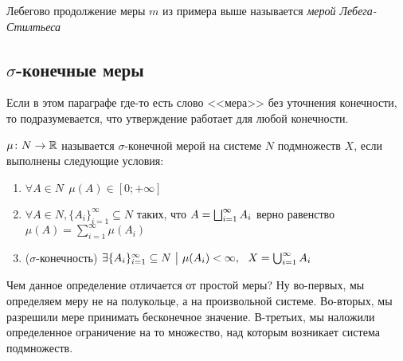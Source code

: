 \begin{definition}
	Лебегово продолжение меры $m$ из примера выше называется \textit{мерой Лебега-Стилтьеса}
\end{definition}

\subsection{$\sigma$-конечные меры}

\begin{note}
	Если в этом параграфе где-то есть слово <<мера>> без уточнения конечности, то подразумевается, что утверждение работает для любой конечности.
\end{note}

\begin{definition}
	$\mu \colon N \to \mathbb{R}$ называется $\sigma$-конечной мерой на системе $N$ подмножеств $X$, если выполнены следующие условия:
	\begin{enumerate}
		\item $\forall A \in N\ \ \mu(A) \in [0; +\infty]$
		
		\item $\forall A \in N, \{A_i\}_{i = 1}^\infty \subseteq N$ таких, что $A = \bigsqcup_{i = 1}^\infty A_i$ верно равенство $\mu(A) = \sum_{i = 1}^\infty \mu(A_i)$
		
		\item ($\sigma$-конечность) $\exists \{A_i\}_{i = 1}^\infty \subseteq N \ \big|\  \mu(A_i) < \infty,\ \ X = \bigcup_{i = 1}^\infty A_i$
	\end{enumerate}
\end{definition}

\begin{note}
	Чем данное определение отличается от простой меры? Ну во-первых, мы определяем меру не на полукольце, а на произвольной системе. Во-вторых, мы разрешили мере принимать бесконечное значение. В-третьих, мы наложили определенное ограничение на то множество, над которым возникает система подмножеств.
\end{note}

